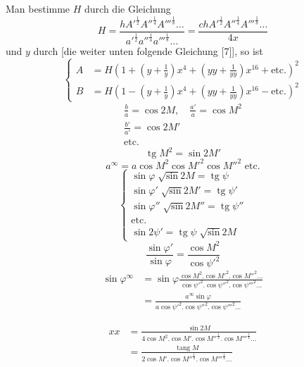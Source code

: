 \noindent Man bestimme \(H\) durch die Gleichung
\begin{equation*}\tag*{[4]}
H=\frac{hA'^{\frac12}A''^{\frac14}A'''^{\frac18}\ldots}{a'^{\frac12}a''^{\frac14}a'''^{\frac18}\ldots}
=\frac{chA'^{\frac12}A''^{\frac14}A'''^{\frac18}\ldots}{4x}
\end{equation*}
\noindent und \(y\) durch [die weiter unten folgende Gleichung [7]], so ist
\begin{equation*}\tag*{[5]}
\left\{\begin{aligned}
A&=H\left(1+\left(y+\frac1y\right)x^4+\left(yy+\frac1{yy}\right)x^{16}+\text{etc.}\right)^2\\[.5em]
B&=H\left(1-\left(y+\frac1y\right)x^4+\left(yy+\frac1{yy}\right)x^{16}-\text{etc.}\right)^2
\end{aligned}\right.
\end{equation*}
\noindent [S.\ 38]
\[\begin{gathered}
\frac ba=\cos2M,\quad\frac{a'}a=\cos M^2\\[.4em]
\frac{b'}{a'}=\cos2M'\\
\text{etc.}
\end{gathered}\]
\[\operatorname{tg}M^2=\sin2M'\]
\[a^\infty=a\cos M^2\cos M'^{2}\cos M''^{2}\text{ etc.}\]
\begin{equation*}\tag*{[6]}
\left\{\begin{gathered}
\sin\varphi\;\surd\sin2M=\operatorname{tg}\psi\\
\sin\varphi'\;\surd\sin2M'=\operatorname{tg}\psi'\\
\sin\varphi''\;\surd\sin2M''=\operatorname{tg}\psi''\\
\text{etc.}\\
\sin2\psi'=\operatorname{tg}\psi\;\surd\sin2M
\end{gathered}\right.
\end{equation*}
\[\frac{\sin\varphi'}{\sin\varphi}=\frac{\cos M^2}{\cos\psi'^{2}}\]
\clearpage{}
{\small
\[\begin{aligned}
\sin\varphi^\infty&=\sin\varphi\frac{\cos M^2.\cos M'^{2}.\cos M''^{2}\ldots}{\cos\psi'^{2}.\cos\psi''^{2}.\cos\psi'''^{2}\ldots}\\
&=\frac{a^\infty\sin\varphi}{a\cos\psi'^{2}.\cos\psi''^{2}.\cos\psi'''^{2}\ldots}
\end{aligned}\]}
\noindent [Es folgt ein Beispiel \(2M=75^0\)]
\ClosingRule
\par\medskip\noindent [S.\ 39]
\[\begin{aligned}
xx&=\frac{\sin2M}{4\cos M^2.\cos M'.\cos M''^{\frac12}.\cos M'''^{\frac14}\ldots}\\[.6em]
&=\frac{\operatorname{tang}M}{2\cos M'.\cos M''^{\frac12}.\cos M'''^{\frac14}\ldots}
\end{aligned}\]
